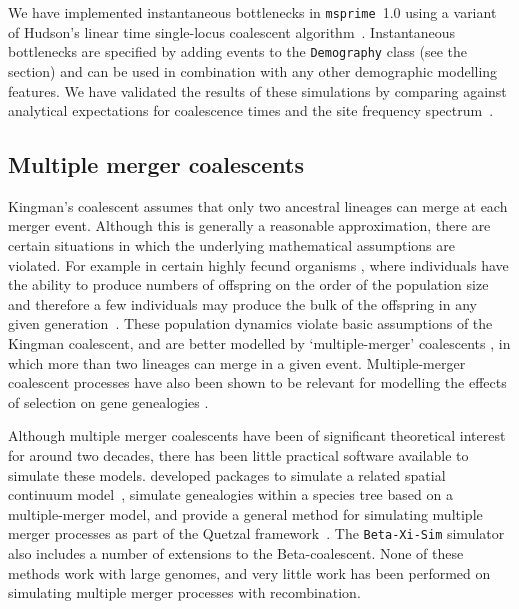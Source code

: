 \documentclass{article}
\newcommand{\msprime}[0]{\texttt{msprime}}
\begin{document}
We have implemented instantaneous bottlenecks in \msprime~1.0
using a variant of Hudson's linear time single-locus coalescent
algorithm~\citep{hudson1990gene}. Instantaneous bottlenecks are specified
by adding events to the \texttt{Demography} class
(see the  section)
and can be used in combination with any other demographic modelling
features. We have validated the results of these simulations by comparing
against analytical expectations for coalescence times and the
site frequency spectrum~\citep{bunnefeld2015inferring}.

\subsection*{Multiple merger coalescents}

Kingman's coalescent assumes that only two ancestral lineages can merge at
each merger event. Although this is generally a reasonable approximation, there
are certain situations in which the underlying mathematical assumptions are
violated. For example in certain highly fecund organisms
\citep{hedgecock_94,B94,HP11,A04,irwin16}, where individuals have the ability
to produce numbers of offspring on the order of the population size and
therefore a few individuals may produce the bulk of the offspring in any given
generation~\citep{hedgecock_94}. These population dynamics violate basic
assumptions of the Kingman coalescent, and are better modelled by
`multiple-merger' coalescents \citep{DK99,P99,S99,S00,MS01}, in which more than
two lineages can merge in a given event. Multiple-merger coalescent processes
have also been shown to be relevant for modelling the effects of selection on
gene genealogies
\citep{Gillespie909,DS04,desai2013genetic,neher2013genealogies,schweinsberg2017rigorous}.

Although multiple merger coalescents have been of significant theoretical
interest for around two decades, there has been little practical software
available to simulate these models.
\cite{kelleher2013coalescent,kelleher2014coalescent} developed packages to
simulate a related spatial continuum model~\citep{barton2010new},
\cite{zhu2015hybrid} simulate genealogies within a species tree
based on a multiple-merger model, and
\cite{becheler2020occupancy} provide a general method for simulating
multiple merger processes
as part of the Quetzal framework~\citep{becheler2019quetzal}.
The \texttt{Beta-Xi-Sim} simulator~\citep{koskela2018multi,koskela2019robust}
also includes a number of extensions to the Beta-coalescent.
None of these methods work with large genomes, and very little work
has been performed on simulating multiple merger processes with recombination.
\end{document}
